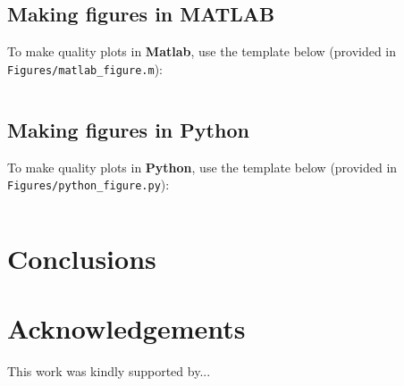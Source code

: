 \documentclass[conference]{IEEEtran}
\begin{document}
\subsection{Making figures in MATLAB}
\label{sec_matlab_figures}
To make quality plots in \textbf{Matlab}, use the template below (provided in \texttt{Figures/matlab\_figure.m}):

\inputminted[frame=lines, framesep=2mm, baselinestretch=1.0,
                bgcolor=white, fontsize=\scriptsize]
                {matlab}{Figures/matlab_figure.m}

\subsection{Making figures in Python}
\label{sec_python_figures}
To make quality plots in \textbf{Python}, use the template below (provided in \texttt{Figures/python\_figure.py}):

\inputminted[frame=lines, framesep=2mm, baselinestretch=1.0,
                bgcolor=white, fontsize=\scriptsize]
                {python}{Figures/python_figure.py}




\lipsum[1-2]

\section{Conclusions}
\label{sec_conclusions}
\lipsum[1]

\section*{Acknowledgements}
This work was kindly supported by...



\end{document}
